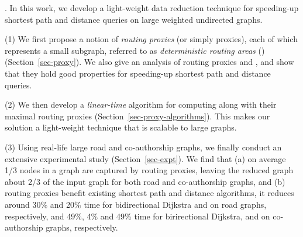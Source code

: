 . In this work, we develop a light-weight data reduction technique for speeding-up shortest  path and distance queries on large weighted undirected graphs.



\stab (1) We first propose a notion of {\em routing proxies} (or simply proxies), each of which represents a small subgraph, referred to as  {\em deterministic routing areas} (\dras)  (Section~\ref{sec-proxy}). We also give an analysis of routing proxies and \dras, and show that they hold good properties for speeding-up shortest path and distance queries.

\stab (2) We then develop a {\em linear-time} algorithm for computing \dras along with their maximal routing proxies (Section~\ref{sec-proxy-algorithms}). This makes our solution a light-weight technique that is scalable to large graphs.


\stab (3) Using real-life large road and co-authorship graphs, we finally conduct an extensive experimental study (Section~\ref{sec-expt}).
We find that (a) on average 1/3 nodes in a graph are captured by routing proxies, leaving the reduced graph about 2/3 of the input graph for both road and co-authorship graphs, and  (b) routing proxies benefit existing shortest  path and distance algorithms, \eg it reduces around 30\% and 20\% time for  bidirectional Dijkstra \cite{LubyR89} and \arcflag \cite{MohringSSWW05} on road graphs, respectively, and 49\%, 4\% and 49\% time for birirectional Dijkstra, \arcflag and \tnr \cite{arz2013transit} on co-authorship graphs, respectively.








